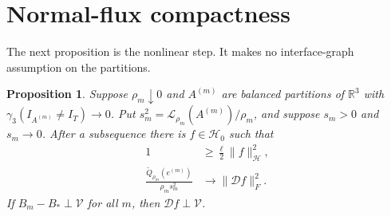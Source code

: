 \documentclass[11pt,reqno]{amsart}
\newtheorem{proposition}[theorem]{Proposition}
\theoremstyle{remark}
\newcommand{\R}{\mathbb R}
\newcommand{\norm}[1]{\lVert #1\rVert}
\newcommand{\ga}{\gamma}
\newcommand{\LL}{\mathcal L}
\newcommand{\HH}{\mathcal H}
\newcommand{\DD}{\mathcal D}
\newcommand{\VV}{\mathcal V}
\begin{document}
\section{Normal-flux compactness}\label{sec:compactness}

The next proposition is the nonlinear step. It makes no interface-graph
assumption on the partitions.

\begin{proposition}\label{prop:compactness}
Suppose $\rho_m\downarrow0$ and $A^{(m)}$ are balanced partitions of
$\R^3$ with $\ga_3(I_{A^{(m)}}\ne I_T)\to0$. Put
$s_m^2=\LL_{\rho_m}(A^{(m)})/\rho_m$, and suppose $s_m>0$ and
$s_m\to0$. After a subsequence there is $f\in\HH_0$ such that
\begin{align}
 1&\ge\frac\ell2\norm{f}_{\HH}^2,\label{eq:flux-liminf}\\
 \frac{\widetilde Q_{\rho_m}(e^{(m)})}{\rho_ms_m^2}
 &\longrightarrow\norm{\DD f}_F^2.\label{eq:interaction-limit}
\end{align}
If $B_m-B_*\perp\VV$ for all $m$, then $\DD f\perp\VV$.
\end{proposition}
\end{document}
